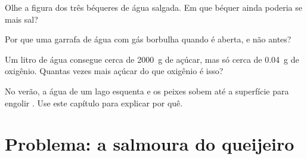 \begin{exercise}[$\star\star$]\label{exo:g6:solutions-and-solubility:9}
Olhe a figura dos três béqueres de água salgada. Em que béquer ainda
poderia se  mais sal?
\end{exercise}

\begin{exercise}[$\star\star$]\label{exo:g6:solutions-and-solubility:10}
Por que uma garrafa de água com gás borbulha quando é aberta, e não
antes?
\end{exercise}

\begin{exercise}[$\star\star\star$]\label{exo:g6:solutions-and-solubility:11}
Um litro de água consegue  cerca de \qty{2000}{g} de açúcar,
mas só cerca de \qty{0.04}{g} de oxigênio. Quantas vezes mais açúcar do
que oxigênio é isso?
\end{exercise}

\begin{exercise}[$\star\star\star$]\label{exo:g6:solutions-and-solubility:12}
No verão, a água de um lago esquenta e os peixes sobem até a superfície
para engolir . Use este capítulo para explicar por quê.
\end{exercise}

\section{Problema: a salmoura do queijeiro}

